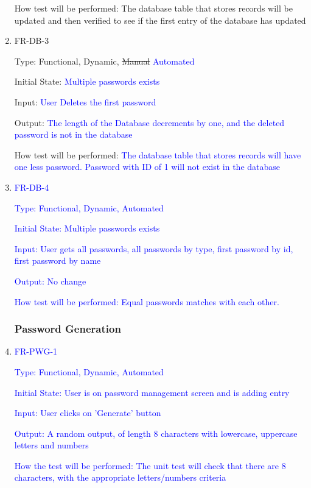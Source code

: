 \documentclass[12pt, titlepage]{article}
\begin{document}
\begin{enumerate}
How test will be performed: The database table that stores records will be updated and then verified to see if the first entry of the database has updated

\item{FR-DB-3\\}

Type: Functional, Dynamic, \sout{Manual} \textcolor{blue}{Automated}

Initial State: \textcolor{blue}{Multiple passwords exists}

Input: \textcolor{blue}{User Deletes the first password}

Output: \textcolor{blue}{The length of the Database decrements by one, and the deleted password is not in the database}

How test will be performed: \textcolor{blue}{The database table that stores records will have one less password. Password with ID of 1 will not exist in the database}

\item{\textcolor{blue}{FR-DB-4}\\}

\textcolor{blue}{Type: Functional, Dynamic, Automated}

\textcolor{blue}{Initial State: Multiple passwords exists}

\textcolor{blue}{Input: User gets all passwords, all passwords by type, first password by id, first password by name}

\textcolor{blue}{Output: No change}

\textcolor{blue}{How test will be performed: Equal passwords matches with each other.} 

\subsubsection{Password Generation}

\item{\textcolor{blue}{FR-PWG-1}\\}

\textcolor{blue}{Type: Functional, Dynamic, Automated}

\textcolor{blue}{Initial State: User is on password management screen and is adding entry}

\textcolor{blue}{Input: User clicks on 'Generate' button}

\textcolor{blue}{Output: A random output, of length 8 characters with lowercase, uppercase letters and numbers}

\textcolor{blue}{How the test will be performed: The unit test will check that there are 8 characters, with the appropriate letters/numbers criteria}

\end{enumerate}
\end{document}
